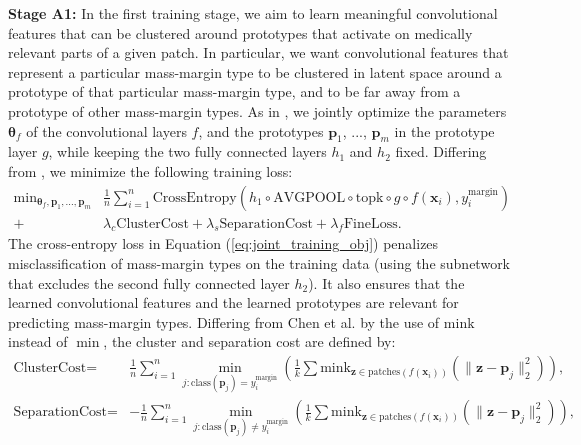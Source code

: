 \documentclass[11pt]{article}
\begin{document}
\textbf{Stage A1:} In the first training stage, we aim to learn meaningful convolutional features that can be clustered around prototypes that activate on medically relevant parts of a given patch. In particular, we want convolutional features that represent a particular mass-margin type to be clustered in latent space around a prototype of that particular mass-margin type, and to be far away from a prototype of other mass-margin types. As in \cite{PPNet}, we jointly optimize the parameters $\mathbf{\theta}_f$ of the convolutional layers $f$, and the prototypes $\mathbf{p}_1$, ..., $\mathbf{p}_m$ in the prototype layer $g$, while keeping the two fully connected layers $h_1$ and $h_2$ fixed. Differing from \cite{PPNet}, we minimize the following training loss:
\begin{align}
    \textrm{min}_{\mathbf{\theta}_f, \mathbf{p}_1, ..., \mathbf{p}_m} & \frac{1}{n} \sum_{i=1}^n \textrm{CrossEntropy}(h_1 \circ \textrm{AVGPOOL} \circ \textrm{topk} \circ g \circ f(\mathbf{x}_i), y^{\text{margin}}_i) \nonumber\\ +& \lambda_c \textrm{ClusterCost} + \lambda_s \textrm{SeparationCost} + \lambda_f \textrm{FineLoss}.
    \label{eq:joint_training_obj}
\end{align}
The cross-entropy loss in Equation (\ref{eq:joint_training_obj}) penalizes  misclassification of mass-margin types on the training data (using the subnetwork that excludes the second fully connected layer $h_2$). It also ensures that the learned convolutional features and the learned prototypes are relevant for predicting mass-margin types. Differing from Chen et al. \citep{PPNet} by the use of $\mathrm{mink}$ instead of $\min$, the cluster and separation cost are defined by:
\begin{align}
\textrm{ClusterCost} =& \frac{1}{n}\sum_{i=1}^{n} \min_{j:\text{class}(\mathbf{p}_j)=y^{\text{margin}}_i} \left(\frac{1}{k}\sum\mathrm{mink}_{\mathbf{z} \in \text{patches}(f(\mathbf{x}_i))}\left(\|\mathbf{z}-\mathbf{p}_j\|_2^2\right)\right), \label{eq:cluster_cost}\\
\textrm{SeparationCost} =& -\frac{1}{n}\sum_{i=1}^{n} \min_{j:\text{class}(\mathbf{p}_j) \neq y^{\text{margin}}_i} \left(\frac{1}{k}\sum\mathrm{mink}_{\mathbf{z} \in \text{patches}(f(\mathbf{x}_i))}\left(\|\mathbf{z}-\mathbf{p}_j\|_2^2\right)\right), \label{eq:separation_cost}
\end{align}
\end{document}
